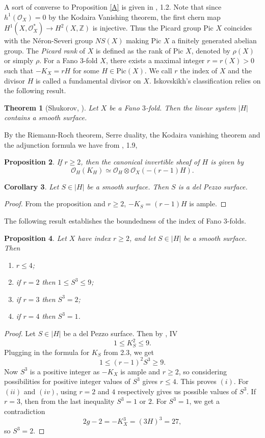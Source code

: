 \documentclass[11pt]{amsart}
\theoremstyle{plain}
\newtheorem{theorem}{Theorem}[section]
\newtheorem{corollary}[theorem]{Corollary}
\newtheorem{proposition}[theorem]{Proposition}
\theoremstyle{definition}
\theoremstyle{expl}
\begin{document}
A sort of converse to Proposition \ref{A} is given in \cite{Isk78}, 1.2.
Note that since $h^1(\mathcal{O}_X)=0$ by the Kodaira Vanishing theorem, the first chern map $H^1(X,\mathcal{O}_X^*) \to H^2(X,\mathbb{Z})$ is injective. Thus the Picard group Pic $X$ coincides with the N\'{e}ron-Severi group $NS(X)$ making Pic $X$ a finitely generated abelian group. The \textit{Picard rank} of $X$ is defined as the rank of Pic $X$, denoted by $\rho(X)$ or simply $\rho$. 
\medbreak
For a Fano $3$-fold $X$, there exists a maximal integer $r = r(X) >0$ such that $-K_X = rH$ for some $H \in \text{Pic}(X)$. We call $r$ the index of $X$ and the divisor $H$ is called a fundamental divisor on $X$.
Iskovskikh's classification relies on the following result.
\begin{theorem}[Shukorov, \cite{Sokudivisor}]
\label{B}
Let $X$ be a Fano $3$-fold. Then the linear system $|H|$ contains a smooth surface.
\end{theorem}
By the Riemann-Roch theorem, Serre duality, the Kodaira vanishing theorem and the adjunction formula we have from \cite{Isk77}, 1.9,
\begin{proposition}
    If $r \geq 2$, then the canonical invertible sheaf of $H$ is given by 
    \[
    \mathcal{O}_H(K_{H}) \simeq \mathcal{O}_H \otimes \mathcal{O}_X(-(r-1)H).
    \]
\end{proposition}
\begin{corollary}
 Let $S \in |H|$ be a smooth surface. Then $S$ is a del Pezzo surface. 	
\end{corollary}
\begin{proof}
 From the proposition and $r\geq 2$, $-K_S = (r-1)H$ is ample. 
\end{proof}
The following result establishes the boundedness of the index of Fano $3$-folds. 
\begin{proposition}
    Let $X$ have index $r\geq 2$, and let $S \in |H|$ be a smooth surface. Then 
    \begin{enumerate}
        \item[(i)] $r \leq 4$;
        \item[(ii)] if $r=2$ then $1 \leq S^3 \leq 9$;
        \item[(ii)] if $r=3$ then $S^3=2$;
        \item[(iv)] if $r=4$ then $S^3=1$.
    \end{enumerate}
\end{proposition}
\begin{proof}
	Let $S \in |H|$ be a del Pezzo surface. Then by \cite{Manin}, IV 
   \[ 1\leq K_S^2 \leq 9.\]
Plugging in the formula for $K_S$ from 2.3, we get 
\[
1 \leq (r-1)^2 S^3 \geq 9.
\]   
Now $S^3$ is a positive integer	as $-K_X$ is ample and $r\geq 2$, so considering possibilities for positive integer values of $S^3$ gives $r\leq 4$. This proves $(i)$. For $(ii)$ and $(iv)$, using $r=2$ and $4$ respectively gives us possible values of $S^3$. If $r=3$, then from the last inequality $S^3 =1$ or $2$. For $S^3=1$, we get a contradiction
\[
2g-2 = -K_X^3 = (3H)^3 = 27,
\]
so $S^3=2$.		
\end{proof}
\end{document}
